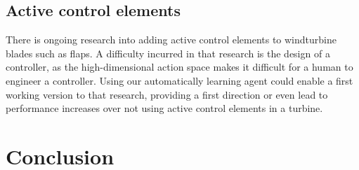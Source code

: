 \documentclass[hyperref,german,beleg]{cgvpub}
\begin{document}
\section{Active control elements}
There is ongoing research into adding active control elements to windturbine blades such as flaps. A difficulty incurred in that research is the design of a controller, as the high-dimensional action space makes it difficult for a human to engineer a controller. Using our automatically learning agent could enable a first working version to that research, providing a first direction or even lead to performance increases over not using active control elements in a turbine.

\chapter{Conclusion}

\end{document}
